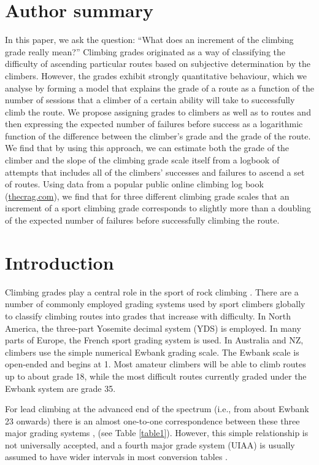 \documentclass[ba]{imsart}
\begin{document}
\section{Author summary}

In this paper, we ask the question: ``What does an increment of the climbing grade really mean?''  Climbing grades originated as a way of classifying the difficulty of ascending particular routes based on subjective determination by the climbers.  However, the grades exhibit strongly quantitative behaviour, which we analyse by forming a model that explains the grade of a route as a function of the number of sessions that a climber of a certain ability will take to successfully climb the route. We propose assigning grades to climbers as well as to routes and then expressing the expected number of failures before success as a logarithmic function of the difference between the climber's grade and the grade of the route.  We find that by using this approach, we can estimate both the grade of the climber and the slope of the climbing grade scale itself from a logbook of attempts that includes all of the climbers' successes and failures to ascend a set of routes.  Using data from a popular public online climbing log book (\url{thecrag.com}), we find that for three different climbing grade scales that an increment of a sport climbing grade corresponds to slightly more than a doubling of the expected number of failures before successfully climbing the route.

\section{Introduction}

Climbing grades play a central role in the sport of rock climbing \citep{delignieres1993psychophysical,draper2015comparative}. There are a number of commonly employed grading systems used by sport climbers globally to classify climbing routes into grades that increase with difficulty.  In North America, the three-part Yosemite decimal system (YDS) is employed.  In many parts of Europe, the French sport grading system is used.  In Australia and NZ, climbers use the simple numerical Ewbank grading scale. The Ewbank scale is open-ended and begins at 1. Most amateur climbers will be able to climb routes up to about grade 18, while the most difficult routes currently graded under the Ewbank system are grade 35.

For lead climbing at the advanced end of the spectrum (i.e., from about Ewbank 23 onwards) there is an almost one-to-one correspondence between these three major grading systems \citep{draper2015comparative}, (see Table \ref{table1}).  However, this simple relationship is not universally accepted, and a fourth major grade system (UIAA) is usually assumed to have wider intervals in most conversion tables \citep{draper2015comparative}.
\end{document}
